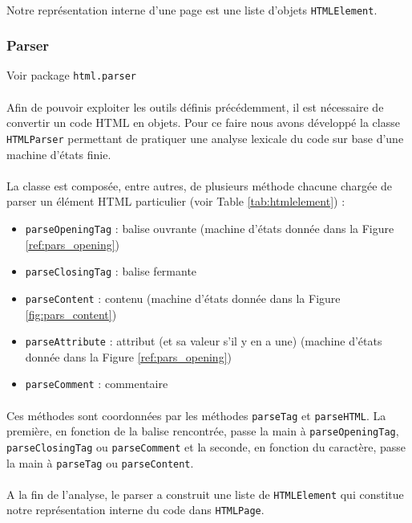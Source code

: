 \documentclass[a4paper,11pt]{article}
\newcommand{\ttseek}[1]{Voir package \texttt{#1}\paragraph{}}
\begin{document}
\paragraph{}
Notre représentation interne d'une page est une liste d'objets \texttt{HTMLElement}.
\subsubsection{Parser}
\ttseek{html.parser}
Afin de pouvoir exploiter les outils définis précédemment, il est nécessaire de convertir un code HTML en objets. Pour ce faire nous avons développé la classe \texttt{HTMLParser} permettant de pratiquer une analyse lexicale du code sur base d'une machine d'états finie.
\paragraph{}
La classe est composée, entre autres, de plusieurs méthode chacune chargée de parser un élément HTML particulier (voir Table \ref{tab:htmlelement}) :
\begin{itemize}
	\item \texttt{parseOpeningTag} : balise ouvrante (machine d'états donnée dans la Figure \ref{ref:pars_opening})
	\item \texttt{parseClosingTag} : balise fermante
	\item \texttt{parseContent} : contenu (machine d'états donnée dans la Figure \ref{fig:pars_content})
	\item \texttt{parseAttribute} : attribut (et sa valeur s'il y en a une) (machine d'états donnée dans la Figure \ref{ref:pars_opening})
	\item \texttt{parseComment} : commentaire
\end{itemize}
\paragraph{}
Ces méthodes sont coordonnées par les méthodes \texttt{parseTag} et \texttt{parseHTML}. La première, en fonction de la balise rencontrée, passe la main à \texttt{parseOpeningTag}, \texttt{parseClosingTag} ou \texttt{parseComment} et la seconde, en fonction du caractère, passe la main à \texttt{parseTag} ou \texttt{parseContent}.
\paragraph{}
A la fin de l'analyse, le parser a construit une liste de \texttt{HTMLElement} qui constitue notre représentation interne du code dans \texttt{HTMLPage}.
\end{document}
